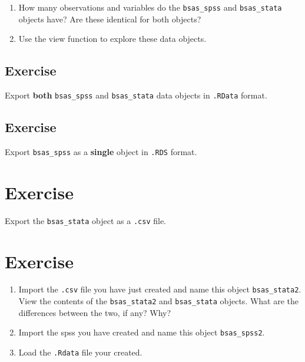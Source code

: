 \documentclass[
]{book}
\providecommand{\tightlist}{%
  \setlength{\itemsep}{0pt}\setlength{\parskip}{0pt}}
\begin{document}
\begin{enumerate}
\def\labelenumi{\alph{enumi}.}
\tightlist
\item
  How many observations and variables do the \texttt{bsas\_spss} and \texttt{bsas\_stata} objects have? Are these identical for both objects?
\item
  Use the view function to explore these data objects.
\end{enumerate}

\hypertarget{exercise-7}{%
\subsection{Exercise}\label{exercise-7}}

Export \textbf{both} \texttt{bsas\_spss} and \texttt{bsas\_stata} data objects in \texttt{.RData} format.

\hypertarget{exercise-8}{%
\subsection{Exercise}\label{exercise-8}}

Export \texttt{bsas\_spss} as a \textbf{single} object in \texttt{.RDS} format.

\hypertarget{exercise-9}{%
\section{Exercise}\label{exercise-9}}

Export the \texttt{bsas\_stata} object as a \texttt{.csv} file.

\hypertarget{exercise-10}{%
\section{Exercise}\label{exercise-10}}

\begin{enumerate}
\def\labelenumi{\alph{enumi}.}
\tightlist
\item
  Import the \texttt{.csv} file you have just created and name this object \texttt{bsas\_stata2}. View the contents of the \texttt{bsas\_stata2} and \texttt{bsas\_stata} objects. What are the differences between the two, if any? Why?
\item
  Import the spss you have created and name this object \texttt{bsas\_spss2}.
\item
  Load the \texttt{.Rdata} file your created.
\end{enumerate}
\end{document}
